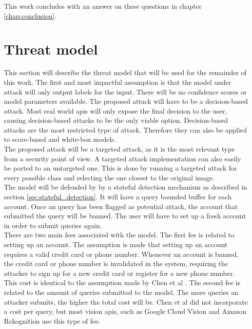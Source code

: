 This work concludes with an answer on these questions in chapter \ref{chap:conclusion}.

\section{Threat model}\label{sec:threat_model}
This section will describe the threat model that will be used for the remainder of this work. The first and most impactful assumption is that the model under attack will only output labels for the input. There will be no confidence scores or model parameters available. The proposed attack will have to be a decision-based attack. Most real world \glspl{api} will only expose the final decision to the user, causing decision-based attacks to be the only viable option. Decision-based attacks are the most restricted type of attack. Therefore they can also be applied to score-based and white-box models.\\

The proposed attack will be a targeted attack, as it is the most relevant type from a security point of view. A targeted attack implementation can also easily be ported to an untargeted one. This is done by running a targeted attack for every possible class and selecting the one closest to the original image.\\

The model will be defended by by a stateful detection mechanism \cite{chen_stateful_2019} as described in section \ref{sec:stateful_detection}. It will have a query bounded buffer for each account. Once an query has been flagged as potential attack, the account that submitted the query will be banned. The user will have to set up a fresh account in order to submit queries again.\\

There are two main fees associated with the model. The first fee is related to setting up an account. The assumption is made that setting up an account requires a valid credit card or phone number. Whenever an account is banned, the credit card or phone number is invalidated in the system, requiring the attacker to sign up for a new credit card or register for a new phone number. This cost is identical to the assumption made by Chen et al \cite{chen_stateful_2019}. The second fee is related to the amount of queries submitted to the model. The more queries an attacker submits, the higher the total cost will be. Chen et al \cite{chen_stateful_2019} did not incorporate a cost per query, but most vision \glspl{api}, such as Google Cloud Vision \cite{google_pricing} and Amazon Rekognition \cite{amazon_pricing} use this type of fee.\\

